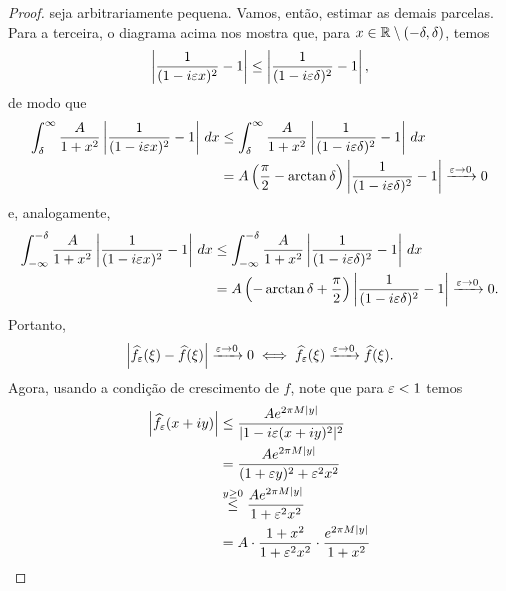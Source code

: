 \begin{proof}
            seja arbitrariamente pequena. Vamos, então, estimar as demais parcelas. Para a terceira, o diagrama
            acima nos mostra que, para $x\in\mathbb{R}\setminus (-\delta, \delta)$, temos
            \begin{align*}
                \left| \frac{1}{(1-i\varepsilon x)^2} - 1 \right| \leq \left| \frac{1}{(1-i\varepsilon\delta)^2} - 1 \right|,
            \end{align*}
            de modo que
            \begin{align*}
                \int_{\delta}^{\infty} \frac{A}{1+ x^2}\left| \frac{1}{(1-i\varepsilon x)^2} - 1 \right| \, dx
                &\leq \int_{\delta}^{\infty} \frac{A}{1+ x^2}\left| \frac{1}{(1-i\varepsilon\delta)^2} - 1 \right| \, dx \\
                &=  A\left( \frac{\pi}{2} - \arctan\delta \right) \left| \frac{1}{(1-i\varepsilon\delta)^2} - 1 \right| 
                \xrightarrow{\varepsilon\to 0} 0
            \end{align*}
            e, analogamente,
            \begin{align*}
                \int_{-\infty}^{-\delta} \frac{A}{1+ x^2}\left| \frac{1}{(1-i\varepsilon x)^2} - 1 \right| \, dx
                &\leq \int_{-\infty}^{-\delta} \frac{A}{1+ x^2}\left| \frac{1}{(1-i\varepsilon\delta)^2} - 1 \right| \, dx \\
                &=  A\left( -\arctan\delta + \frac{\pi}{2} \right) \left| \frac{1}{(1-i\varepsilon\delta)^2} - 1 \right| 
                \xrightarrow{\varepsilon\to 0} 0.
            \end{align*}
            Portanto,
            \begin{equation*}
                \left| \widehat{f_{\varepsilon}}(\xi) - \widehat{f}(\xi) \right| \xrightarrow{\varepsilon\to 0} 0 
                \iff \widehat{f_{\varepsilon}}(\xi) \xrightarrow{\varepsilon\to 0} \widehat{f}(\xi).
            \end{equation*}
            Agora, usando a condição de crescimento de $f$, note que
            para $\varepsilon<1$ temos
            \begin{align*}
                \left| \widehat{f_{\e}}(x+iy) \right| &\leq \frac{Ae^{2\pi M|y|}}{|1 - i\e (x+iy)^2|^2} \\
                &= \frac{Ae^{2\pi M|y|}}{(1+ \e y)^2 + \e^2x^2} \\
                &\stackrel{y\geq 0}{\leq} \frac{Ae^{2\pi M|y|}}{1 + \e^2x^2} \\
                &= A\cdot\frac{1+x^2}{1 + \e^2x^2}\cdot\frac{e^{2\pi M|y|}}{1 + x^2} \\

\end{align*}
\end{proof}
